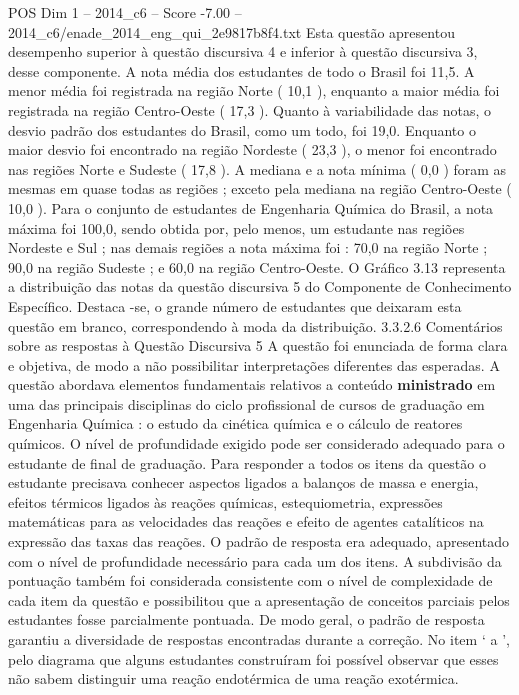 \begin{textsample}{POS Dim 1 – 2014\_c6 – Score -7.00 – 2014\_c6/enade\_2014\_eng\_qui\_2e9817b8f4.txt}
Esta questão apresentou desempenho superior à questão discursiva 4 e inferior à questão discursiva 3, desse componente.
A nota média dos estudantes de todo o Brasil foi 11,5.
A menor média foi registrada na região Norte ( 10,1 ), enquanto a maior média foi registrada na região Centro-Oeste ( 17,3 ).
Quanto à variabilidade das notas, o desvio padrão dos estudantes do Brasil, como um todo, foi 19,0.
Enquanto o maior desvio foi encontrado na região Nordeste ( 23,3 ), o menor foi encontrado nas regiões Norte e Sudeste ( 17,8 ).
A mediana e a nota mínima ( 0,0 ) foram as mesmas em quase todas as regiões ; exceto pela mediana na região Centro-Oeste ( 10,0 ).
Para o conjunto de estudantes de Engenharia Química do Brasil, a nota máxima foi 100,0, sendo obtida por, pelo menos, um estudante nas regiões Nordeste e Sul ; nas demais regiões a nota máxima foi : 70,0 na região Norte ; 90,0 na região Sudeste ; e 60,0 na região Centro-Oeste.
O Gráfico 3.13 representa a distribuição das notas da questão discursiva 5 do Componente de Conhecimento Específico.
Destaca -se, o grande número de estudantes que deixaram esta questão em branco, correspondendo à moda da distribuição. 3.3.2.6 Comentários sobre as respostas à Questão Discursiva 5 A questão foi enunciada de forma clara e objetiva, de modo a não possibilitar interpretações diferentes das esperadas.
A questão abordava elementos fundamentais relativos a conteúdo \textbf{ministrado} em uma das principais disciplinas do ciclo profissional de cursos de graduação em Engenharia Química : o estudo da cinética química e o cálculo de reatores químicos.
O nível de profundidade exigido pode ser considerado adequado para o estudante de final de graduação.
Para responder a todos os itens da questão o estudante precisava conhecer aspectos ligados a balanços de massa e energia, efeitos térmicos ligados às reações químicas, estequiometria, expressões matemáticas para as velocidades das reações e efeito de agentes catalíticos na expressão das taxas das reações.
O padrão de resposta era adequado, apresentado com o nível de profundidade necessário para cada um dos itens.
A subdivisão da pontuação também foi considerada consistente com o nível de complexidade de cada item da questão e possibilitou que a apresentação de conceitos parciais pelos estudantes fosse parcialmente pontuada.
De modo geral, o padrão de resposta garantiu a diversidade de respostas encontradas durante a correção.
No item ‘ a ’, pelo diagrama que alguns estudantes construíram foi possível observar que esses não sabem distinguir uma reação endotérmica de uma reação exotérmica.

\end{textsample}
